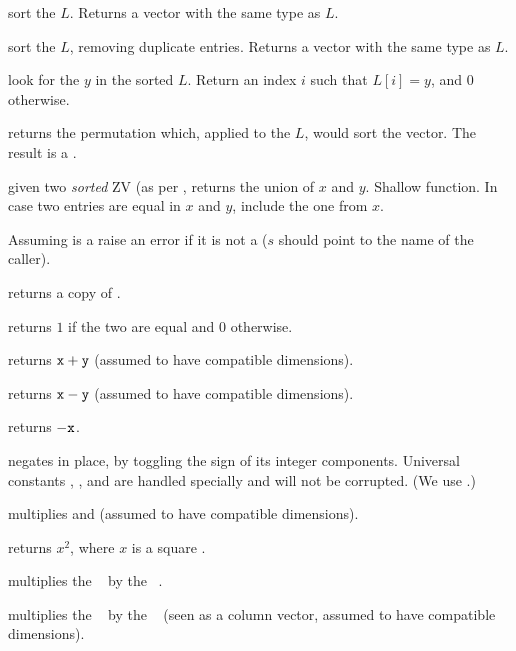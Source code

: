  sort the  $L$.
Returns a vector with the same type as $L$.

 sort the  $L$, removing duplicate
entries. Returns a vector with the same type as $L$.

 look for the  $y$ in the sorted
 $L$. Return an index $i$ such that $L[i] = y$, and  $0$ otherwise.

 returns the permutation which, applied to the
 $L$, would sort the vector. The result is a .

 given two \emph{sorted} ZV (as per
, returns the union of $x$ and $y$. Shallow function. In case two
entries are equal in $x$ and $y$,  include the one from $x$.


 Assuming  is a 
raise an error if it is not a  ($s$ should point to the name of the
caller).

 returns a copy of .

 returns $1$ if the two  are equal
and $0$ otherwise.

 returns ${\tt x} + {\tt y}$ (assumed to have
compatible dimensions).

 returns ${\tt x} - {\tt y}$ (assumed to have
compatible dimensions).

 returns $-{\tt x}$.

 negates  in place, by toggling the
sign of its integer components. Universal constants ,
,  and  are handled specially and will
not be corrupted. (We use .)

 multiplies  and  (assumed to
have compatible dimensions).

 returns $x^2$, where $x$ is a square .

 multiplies the ~
by the ~.

 multiplies the ~
by the ~ (seen as a column vector, assumed to have compatible
dimensions).

